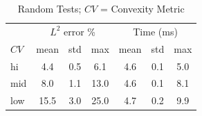 \begin{table}[ht!]
\centering
\caption{Random Tests; $CV$ = Convexity Metric}
\label{table:ch2_random_tests}
\begin{tabular}{@{}lcccccc@{}}
\toprule
    &    \multicolumn{3}{c}{$L^2$ error \%} & \multicolumn{3}{c}{Time (ms)} \\
$CV$  &    mean & std &  max &      mean & std &  max \\
\midrule

hi    &     4.4 & 0.5 &  6.1 &       4.6 & 0.1 & 5.0 \\
mid   &     8.0 & 1.1 & 13.0 &       4.6 & 0.1 & 8.1 \\
low   &    15.5 & 3.0 & 25.0 &       4.7 & 0.2 & 9.9 \\
\bottomrule
\end{tabular}
\end{table}


